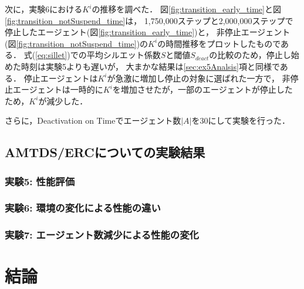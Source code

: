 \documentclass[12pt,a4j,twoside]{jarticle}
\begin{document}
  次に，実験6における$K^i$の推移を調べた．
  図\ref{fig:transition_early_time}と図\ref{fig:transition_notSuspend_time}は，
  1,750,000ステップと2,000,000ステップで停止したエージェント(図\ref{fig:transition_early_time})と，
  非停止エージェント(図\ref{fig:transition_notSuspend_time})の$K^i$の時間推移をプロットしたものである．
  式(\ref{eq:sillet})での平均シルエット係数$S$と閾値$S_{deact}$の比較のため，停止し始めた時刻は実験5よりも遅いが，
  大まかな結果は\ref{sec:ex5Analsis}項と同様である．
  停止エージェントは$K^i$が急激に増加し停止の対象に選ばれた一方で，
  非停止エージェントは一時的に$K^i$を増加させたが，一部のエージェントが停止したため，$K^i$が減少した．
  \par

  さらに，Deactivation on Timeでエージェント数$|A|$を30にして実験を行った．

  
  \subsection{AMTDS/ERCについての実験結果}\label{result_ERC}
  
  \subsubsection{実験5: 性能評価}\label{ex:ERC1}
  
  \subsubsection{実験6: 環境の変化による性能の違い}\label{ex:ERC2}  
  
  \subsubsection{実験7: エージェント数減少による性能の変化}

  \section{結論}

  \clearpage
  
  
\end{document}
